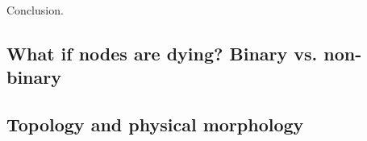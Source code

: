 Conclusion.

\subsection{What if nodes are dying? Binary vs. non-binary}

\subsection{Topology and physical morphology}

